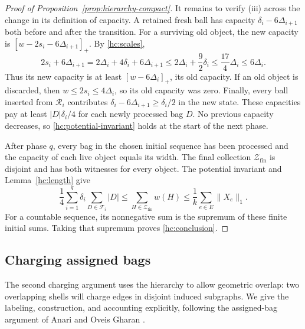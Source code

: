 \documentclass[11pt]{amsart}
\theoremstyle{definition}
\theoremstyle{remark}
\numberwithin{equation}{section}
\begin{document}
\begin{proof}[Proof of Proposition~\ref{prop:hierarchy-compact}]
It remains to verify (iii) across the change in its definition of
capacity.  A retained fresh ball has capacity
\(\delta_i-6\Delta_{i+1}\) both before and after the transition.
For a surviving old object, the new capacity is
\([
w-2s_i-6\Delta_{i+1}]_+\).  By \eqref{hc:scales},
\begin{equation}
\label{hc:reserve}
 2s_i+6\Delta_{i+1}
 =2\Delta_i+4\delta_i+6\Delta_{i+1}
 \le2\Delta_i+\frac92\delta_i
 \le\frac{17}{4}\Delta_i
 \le6\Delta_i.
\end{equation}
Thus its new capacity is at least \([w-6\Delta_i]_+\), its old
capacity.  If an old object is discarded, then
\(w\le2s_i\le4\Delta_i\), so its old capacity was zero.
Finally, every ball inserted from \(\mathcal R_i\) contributes
\(\delta_i-6\Delta_{i+1}\ge\delta_i/2\) in the new state.  These
capacities pay at least \(|D|\delta_i/4\) for each newly processed
bag \(D\).  No previous capacity decreases, so
\eqref{hc:potential-invariant} holds at the start of the next phase.

After phase \(q\), every bag in the chosen initial sequence has been
processed and the capacity of each live object equals its width.
The final collection \(\mathcal Z_{\mathrm{fin}}\) is disjoint and
has both witnesses for every object.  The potential invariant and
Lemma~\ref{hc:length} give
\[
 \frac14\sum_{i=1}^q\delta_i\sum_{D\in\mathcal F_i}|D|
 \le\sum_{H\in\mathcal Z_{\mathrm{fin}}}w(H)
 \le\frac1k\sum_{e\in E}\|X_e\|_1.
\]
For a countable sequence, its nonnegative sum is the supremum of
these finite initial sums.  Taking that supremum proves
\eqref{hc:conclusion}.
\end{proof}

\subsection{Charging assigned bags}
\label{sec:hierarchy-assigned}

The second charging argument uses the hierarchy to allow geometric overlap:
two overlapping shells will charge edges in disjoint induced subgraphs.
We give the labeling, construction, and accounting explicitly, following
the assigned-bag argument of Anari and Oveis Gharan
\cite[Proposition~7.2 and Section~7.2]{AOG}.
\end{document}
